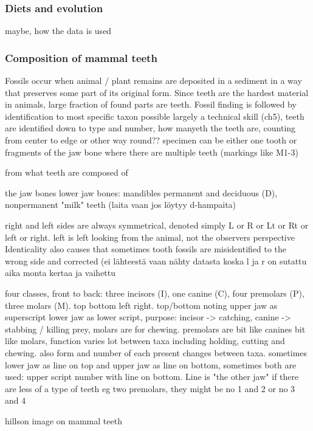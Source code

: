 \documentclass{article}
\begin{document}
\subsubsection{Diets and evolution}

maybe, how the data is used

\subsubsection{Composition of mammal teeth}

Fossils occur when animal / plant remains are deposited in a sediment in a way that preserves 
some part of its original form. Since teeth are the hardest material in animals, large fraction
of found parts are teeth. Fossil finding is followed by identification to most specific taxon possible
largely a technical skill (ch5), teeth are identified down to type and number, how manyeth the teeth are,
counting from center to edge or other way round??
specimen can be either one tooth or fragments of the jaw bone where there are multiple teeth (markings like M1-3)

from \cite{Hillson_2005} what teeth are composed of

 the jaw bones
lower jaw bones: mandibles
 permanent and deciduous (D), nonpermanent "milk" teeth (laita vaan jos löytyy d-hampaita)

right and left sides are always symmetrical, denoted simply L or R or Lt or Rt or left or right. left is left looking from the animal, not the observers perspective
Identicality also causes that sometimes tooth fossils are misidentified to the wrong side and corrected (ei lähteestä vaan nähty datasta koska l ja r on sutattu aika monta kertaa ja vaihettu

four classes, front to back: three incisors (I), one canine (C), four premolars (P), three molars (M). top bottom left right. top/bottom noting upper jaw as superscript lower jaw as lower script, 
 purpose: incisor -> catching, canine -> stabbing / killing prey, molars are for chewing. premolars are bit like canines bit like molars, function varies lot
 between taxa including holding, cutting and chewing. also form and number of each present changes between taxa.
sometimes lower jaw as line on top and upper jaw as line on bottom, sometimes both are used: upper script number with line on bottom. Line is "the other jaw"
if there are less of a type of teeth eg two premolars, they might be no 1 and 2 or no 3 and 4

 hillson image on mammal teeth
\end{document}

